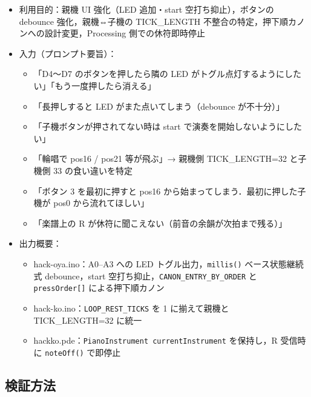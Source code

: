 \documentclass[a4paper,11pt]{ltjsarticle}
\providecommand{\％}{\%}
\begin{document}
\begin{itemize}
    \item 利用目的：親機 UI 強化（LED 追加・start 空打ち抑止），ボタンの debounce 強化，親機⇔子機の TICK\_LENGTH 不整合の特定，押下順カノンへの設計変更，Processing 側での休符即時停止
    \item 入力（プロンプト要旨）：
    \begin{itemize}
        \item 「D4〜D7 のボタンを押したら隣の LED がトグル点灯するようにしたい」「もう一度押したら消える」
        \item 「長押しすると LED がまた点いてしまう（debounce が不十分）」
        \item 「子機ボタンが押されてない時は start で演奏を開始しないようにしたい」
        \item 「輪唱で pos16 / pos21 等が飛ぶ」→ 親機側 TICK\_LENGTH=32 と子機側 33 の食い違いを特定
        \item 「ボタン 3 を最初に押すと pos16 から始まってしまう．最初に押した子機が pos0 から流れてほしい」
        \item 「楽譜上の R が休符に聞こえない（前音の余韻が次拍まで残る）」
    \end{itemize}
    \item 出力概要：
    \begin{itemize}
        \item hack-oya.ino：A0--A3 への LED トグル出力，\texttt{millis()} ベース状態継続式 debounce，start 空打ち抑止，\texttt{CANON\_ENTRY\_BY\_ORDER} と \texttt{pressOrder[]} による押下順カノン
        \item hack-ko.ino：\texttt{LOOP\_REST\_TICKS} を 1 に揃えて親機と TICK\_LENGTH=32 に統一
        \item hackko.pde：\texttt{PianoInstrument currentInstrument} を保持し，R 受信時に \texttt{noteOff()} で即停止
    \end{itemize}
\end{itemize}

\subsection{検証方法}\label{sec:ai-verify}
\end{document}

